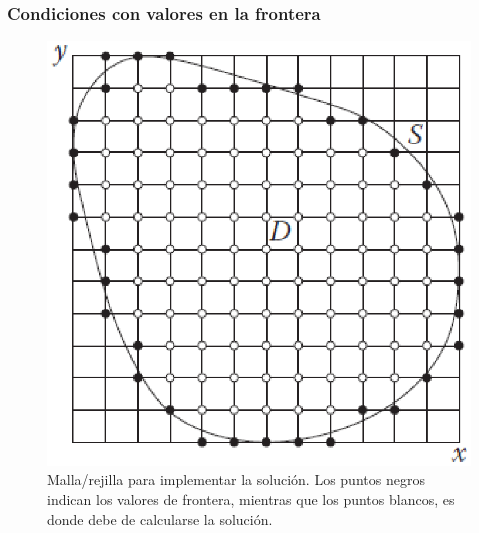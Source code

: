 \documentclass[12pt]{beamer}
\begin{document}
\begin{frame}
\captionsetup{font=scriptsize,labelfont=scriptsize}
\frametitle{Condiciones con valores en la frontera}
\begin{figure}
	\centering
	\includegraphics[scale=0.5]{Imagenes/condicionesEDP_01.eps}
	\caption{Malla/rejilla para implementar la solución. Los puntos negros indican los valores de frontera, mientras que los puntos blancos, es donde debe de calcularse la solución.}
\end{figure}
\end{frame}
\end{document}
